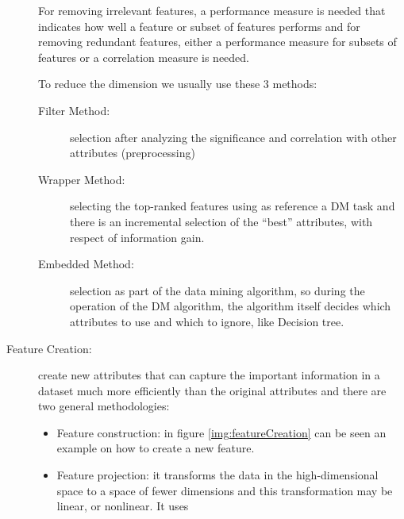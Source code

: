 \begin{description}
                                  For removing irrelevant features, a performance measure is needed that
                                  indicates how well a feature or subset of features performs and for removing
                                  redundant features, either a performance measure for subsets of features or a
                                  correlation measure is needed.

                                  To reduce the dimension we usually use these $3$ methods:
                                  \begin{description}
                                      \item [Filter Method: ] selection after analyzing the significance and 
                                                              correlation with other attributes (preprocessing)
                                      \item [Wrapper Method: ] selecting the top-ranked features using 
                                                               as reference a DM task and there is an incremental
                                                               selection of the “best” attributes, with respect
                                                               of information gain.
                                      \item [Embedded Method: ] selection as part of the data mining algorithm,
                                                                so during the operation of the DM algorithm,
                                                                the algorithm itself decides which attributes to use
                                                                and which to ignore, like Decision tree.
                                  \end{description}
    \item [Feature Creation: ] create new attributes that can capture the important information in a dataset
                               much more efficiently than the original attributes and 
                               there are two general methodologies:
                               \begin{itemize}
                                   \item Feature construction: in figure \ref{img:featureCreation} can be seen
                                         an example on how to create a new feature.
                                   \item Feature projection: it transforms the data in the high-dimensional space
                                         to a space of fewer dimensions and this transformation may be linear,
                                         or nonlinear.\newline
                                         It uses
                               \end{itemize}


\end{description}
